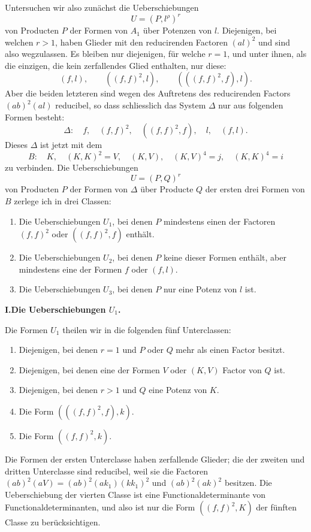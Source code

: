 \documentclass[10pt]{article}
\begin{document}
Untersuchen wir also zunächst die Ueberschiebungen
\[
U=(P,l^\rho)^r
\]
von Producten $P$ der Formen von $A_1$ über Potenzen von $l$. Diejenigen, bei welchen $r>1$, haben Glieder mit den reducirenden Factoren $(al)^2$ und sind also wegzulassen. Es bleiben nur diejenigen, für welche $r=1$, und unter ihnen, als die einzigen, die kein zerfallendes Glied enthalten, nur diese:
\[
(f,l),
\qquad ((f,f)^2,l),
\qquad (((f,f)^2,f),l).
\]
Aber die beiden letzteren sind wegen des Auftretens des reducirenden Factors $(ab)^2(al)$ reducibel, so dass schliesslich das System $\Delta$ nur aus folgenden Formen besteht:
\[
\Delta:
\quad f,
\quad (f,f)^2,
\quad ((f,f)^2,f),
\quad l,
\quad (f,l).
\]
Dieses $\Delta$ ist jetzt mit dem
\[
B:
\quad K,
\quad (K,K)^2=V,
\quad (K,V),
\quad (K,V)^4=j,
\quad (K,K)^4=i
\]
zu verbinden. Die Ueberschiebungen
\[
U=(P,Q)^r
\]
von Producten $P$ der Formen von $\Delta$ über Producte $Q$ der ersten drei Formen von $B$ zerlege ich in drei Classen:
\begin{enumerate}
\item[I.] Die Ueberschiebungen $U_1$, bei denen $P$ mindestens einen der Factoren $(f,f)^2$ oder $((f,f)^2,f)$ enthält.
\item[II.] Die Ueberschiebungen $U_2$, bei denen $P$ keine dieser Formen enthält, aber mindestens eine der Formen $f$ oder $(f,l)$.
\item[III.] Die Ueberschiebungen $U_3$, bei denen $P$ nur eine Potenz von $l$ ist.
\end{enumerate}

\begin{center}
{\bfseries I.\quad Die Ueberschiebungen $U_1$.}
\end{center}

Die Formen $U_1$ theilen wir in die folgenden fünf Unterclassen:
\begin{enumerate}
\item Diejenigen, bei denen $r=1$ und $P$ oder $Q$ mehr als einen Factor besitzt.
\item Diejenigen, bei denen eine der Formen $V$ oder $(K,V)$ Factor von $Q$ ist.
\item Diejenigen, bei denen $r>1$ und $Q$ eine Potenz von $K$.
\item Die Form $(((f,f)^2,f),k)$.
\item Die Form $((f,f)^2,k)$.
\end{enumerate}
Die Formen der ersten Unterclasse haben zerfallende Glieder; die der zweiten und dritten Unterclasse sind reducibel, weil sie die Factoren $(ab)^2(aV)=(ab)^2(ak_1)(kk_1)^2$ und $(ab)^2(ak)^2$ besitzen. Die Ueberschiebung der vierten Classe ist eine Functionaldeterminante von Functionaldeterminanten, und also ist nur die Form $((f,f)^2,K)$ der fünften Classe zu berücksichtigen.
\end{document}
